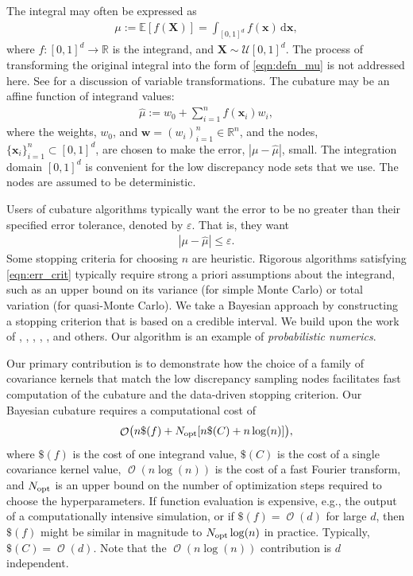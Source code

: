 \documentclass{svjour3}                     %
\DeclareMathOperator{\Order}{{\mathcal O}}
\newcommand{\bm}[1]{\boldsymbol{#1}}
\newcommand{\dif}[1]{\text{d}{#1}}
\newcommand{\reals}{\mathbb{R}}
\newcommand{\Ex}{\mathbb{E}}
\newcommand{\vw}{\bm{w}}
\newcommand{\vx}{\bm{x}}
\newcommand{\opt}{{\textup{opt}}}
\newcommand{\hmu}{\widehat{\mu}}
\newcommand{\errtol}{\varepsilon}
\def\abs#1{\ensuremath{\left \lvert #1 \right \rvert}}
\begin{document}
The integral may often be expressed as
\begin{align}
\label{eqn:defn_mu}
\mu:= \Ex[f(\boldsymbol{X})] = \int_{[0,1]^d} f(\vx)\, \dif\vx, 
\end{align}
where $f:[0,1]^d \to \reals$ is the integrand, and $\boldsymbol{X} \sim \mathcal{U}[0,1]^d$.  The process of transforming the original integral into the form of \eqref{eqn:defn_mu} is not addressed here. See \cite[Section 2.11]{DicEtal14a} 
for a discussion of variable transformations. The cubature may be an affine function of integrand values:
\begin{align}
\label{eqn:defn_hmu}  %
\hmu := w_0 + \sum_{i=1}^{n} f(\vx_i) w_i,
\end{align}
where the weights, $w_0$, and  $\vw = (w_i)_{i=1}^n \in \reals^n$, and the nodes, $\{\vx_i\}_{i=1}^n \subset [0,1]^d$, are chosen to make the error, $\abs{\mu - \hmu}$, small. The integration domain $[0,1]^d$ is convenient for the low discrepancy node sets \citep{DicEtal14a,SloJoe94} that we use.  The nodes are assumed to be deterministic.

Users of cubature algorithms typically want the error to be no greater than their specified error tolerance, denoted by $\varepsilon$.  That is, they want
\begin{align}
\label{eqn:err_crit} 
\abs{\mu - \hmu} \leq \errtol .
\end{align}
Some stopping criteria for choosing $n$ are heuristic.  Rigorous algorithms satisfying \eqref{eqn:err_crit}  typically require strong a priori assumptions about the integrand, such as an upper bound on its variance (for simple Monte Carlo) or total variation (for quasi-Monte Carlo).  We take a Bayesian approach by constructing a stopping criterion that is based on a credible interval.  We build upon the work of \cite{Dia88a}, \cite{OHa91a}, \cite{Rit00a}, \cite{RasGha03a}, \cite{BriEtal18a}, and others.  Our algorithm is an example of \emph{probabilistic numerics}.

Our primary contribution is to demonstrate how the choice of a family of covariance kernels that match the low discrepancy sampling nodes facilitates fast computation of the cubature and the data-driven stopping criterion.  Our Bayesian cubature requires a computational cost of
\begin{equation} \label{eqn:OuralgoCost}
    \Order\bigl(n \$(f) + N_{\opt}[n\$(C) + n \log(n)] \bigr),
\end{equation} 
where $\$(f)$ is the cost of one integrand value, $\$(C)$ is the cost of a single covariance kernel value,  $\Order(n \log(n))$ is the cost of a fast Fourier transform, and $N_{\opt}$ is an upper bound on the number of optimization steps required to choose the hyperparameters. If function evaluation is expensive, e.g., the output of a computationally intensive simulation, or if $\$(f) = \Order(d)$ for large $d$, then $\$(f)$ might be similar in magnitude to $N_{\opt} \log(n)$ in practice.  Typically, $\$(C) = \Order(d)$.  Note that the $\Order(n \log(n))$ contribution is $d$ independent.
\end{document}
